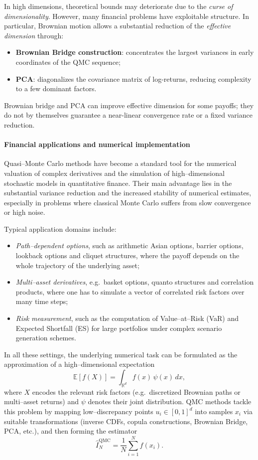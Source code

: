 In high dimensions, theoretical bounds may deteriorate due to the \emph{curse of dimensionality}.  
However, many financial problems have exploitable structure.  
In particular, Brownian motion allows a substantial reduction of the \emph{effective dimension} through:
\begin{itemize}
    \item \textbf{Brownian Bridge construction}: concentrates the largest variances in early coordinates of the QMC sequence;
    \item \textbf{PCA}: diagonalizes the covariance matrix of log-returns, reducing complexity to a few dominant factors.
\end{itemize}
Brownian bridge and PCA can improve effective dimension for some
payoffs; they do not by themselves guarantee a near-linear convergence
rate or a fixed variance reduction.
\paragraph{Financial applications and numerical implementation}

Quasi--Monte Carlo methods have become a standard tool for the numerical valuation of complex derivatives and the simulation of high--dimensional stochastic models in quantitative finance. Their main advantage lies in the substantial variance reduction and the increased stability of numerical estimates, especially in problems where classical Monte Carlo suffers from slow convergence or high noise.

Typical application domains include:
\begin{itemize}
    \item \emph{Path--dependent options}, such as arithmetic Asian options, barrier options, lookback options and cliquet structures, where the payoff depends on the whole trajectory of the underlying asset;
    \item \emph{Multi--asset derivatives}, e.g.\ basket options, quanto structures and correlation products, where one has to simulate a vector of correlated risk factors over many time steps;
    \item \emph{Risk measurement}, such as the computation of Value--at--Risk (VaR) and Expected Shortfall (ES) for large portfolios under complex scenario generation schemes.
\end{itemize}

In all these settings, the underlying numerical task can be formulated as the approximation of a high--dimensional expectation
\[
\mathbb{E}[f(X)] = \int_{\mathbb{R}^d} f(x)\,\psi(x)\,dx,
\]
where $X$ encodes the relevant risk factors (e.g.\ discretized Brownian paths or multi--asset returns) and $\psi$ denotes their joint distribution. QMC methods tackle this problem by mapping low--discrepancy points $u_i \in [0,1]^d$ into samples $x_i$ via suitable transformations (inverse CDFs, copula constructions, Brownian Bridge, PCA, etc.), and then forming the estimator
\[
\widehat{I}_N^{\mathrm{QMC}} = \frac{1}{N} \sum_{i=1}^N f(x_i).
\]

